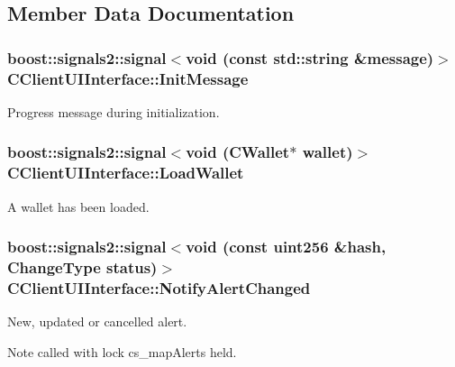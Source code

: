 \subsection{Member Data Documentation}
\hypertarget{class_c_client_u_i_interface_abc63cc3f3e5e15632f713d859dbc6bc2}{}
\subsubsection[{Init\+Message}]{\setlength{\rightskip}{0pt plus 5cm}boost\+::signals2\+::signal$<$void (const std\+::string \&message)$>$ C\+Client\+U\+I\+Interface\+::\+Init\+Message}\label{class_c_client_u_i_interface_abc63cc3f3e5e15632f713d859dbc6bc2}
Progress message during initialization. \hypertarget{class_c_client_u_i_interface_a32a8930a5b69dd92e25fa474bd6e5420}{}
\subsubsection[{Load\+Wallet}]{\setlength{\rightskip}{0pt plus 5cm}boost\+::signals2\+::signal$<$void (C\+Wallet$\ast$ wallet)$>$ C\+Client\+U\+I\+Interface\+::\+Load\+Wallet}\label{class_c_client_u_i_interface_a32a8930a5b69dd92e25fa474bd6e5420}
A wallet has been loaded. \hypertarget{class_c_client_u_i_interface_a2c42ebdda06512513445cd86881b157a}{}
\subsubsection[{Notify\+Alert\+Changed}]{\setlength{\rightskip}{0pt plus 5cm}boost\+::signals2\+::signal$<$void (const {\bf uint256} \&hash, {\bf Change\+Type} status)$>$ C\+Client\+U\+I\+Interface\+::\+Notify\+Alert\+Changed}\label{class_c_client_u_i_interface_a2c42ebdda06512513445cd86881b157a}
New, updated or cancelled alert. \begin{DoxyNote}{Note}
called with lock cs\+\_\+map\+Alerts held. 
\end{DoxyNote}
\hypertarget{class_c_client_u_i_interface_a4bfd5841b9471733b40568ca21eaf010}{}
